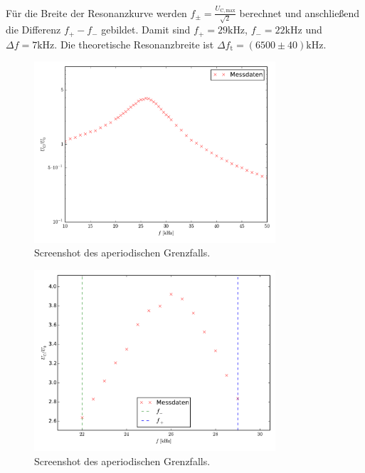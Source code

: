 Für die Breite der Resonanzkurve werden $f_\pm=\frac{U_\mathup{C,max}}{\sqrt{2}}$ berechnet und anschließend die Differenz $f_+-f_-$ gebildet. 
Damit sind $f_+=29\si{\kilo\hertz}$, $f_-=22\si{\kilo\hertz}$ und $\Delta{f}=7\si{\kilo\hertz}$. 
Die theoretische Resonanzbreite ist $\Delta{f_\mathup{t}}=(6500\pm40)\si{\kilo\hertz}$.
\begin{figure}[h]
		\centering
		\includegraphics[width=0.8\textwidth]{build/plot_amplitude_semilog.pdf}
		\caption{Screenshot des aperiodischen Grenzfalls.}
\end{figure}
\begin{figure}[h]
		\centering
		\includegraphics[width=0.8\textwidth]{build/plot_amplitude_linear.pdf}
		\caption{Screenshot des aperiodischen Grenzfalls.}
\end{figure}

